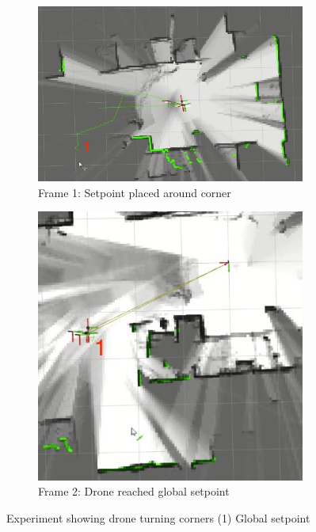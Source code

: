 \documentclass[capstone_report.tex]{subfiles}
\begin{document}
\begin{figure}[H]
    \centering
    \begin{subfigure}[b]{0.5\textwidth}
        \centering
        \includegraphics[width=0.97\textwidth]{./imgs/turn_corners/an_frame_1.jpg}
        \caption{Frame 1: Setpoint placed around corner}
        \label{fig:avoid_obs_1}
    \end{subfigure}%
    \begin{subfigure}[b]{0.5\textwidth}
        \centering
        \includegraphics[width=0.97\textwidth]{./imgs/turn_corners/an_frame_2.jpg}
        \caption{Frame 2: Drone reached global setpoint}
        \label{fig:avoid_obs_2}
    \end{subfigure}
    \caption{Experiment showing drone turning corners (1) Global setpoint\label{fig:avoid_obs}}
\end{figure}
\end{document}
